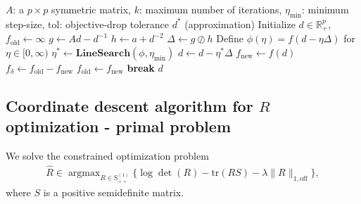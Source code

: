 \documentclass[12pt]{amsart}
\numberwithin{equation}{section}
\numberwithin{equation}{section}
\theoremstyle{plain}
\theoremstyle{definition}
\DeclareMathOperator*{\argmax}{\arg\max}
\newcommand{\tr}{\mathrm{tr}}
\newcommand{\Sppone}{\mathrm{S}_{++}^{(1)}}
\begin{document}
 
\begin{algorithm}[H]
\caption{Diagonal Newton Method for $D$ Optimization}
\label{algo:diag_hess}
\begin{algorithmic}[1]
\Require $A$: a $p\times p$ symmetric matrix, $k$: maximum number of iterations, $\eta_{\min}$: minimum step-size, $\mathrm{tol}$: objective-drop tolerance
\Ensure $d^\ast$ (approximation) 
\State Initialize $d \in \mathbb{R}^p_+$, $f_{\text{old}} \gets \infty$
    \State $g \gets Ad - d^{-1}$ 
    \State $h \gets a+d^{-2}$ 
    \State $\Delta \gets g \oslash h$ 
    \State Define $\phi(\eta) = f(d - \eta\Delta)$ for $\eta\in [0,\infty)$
    \State $\eta^* \gets \textbf{LineSearch}(\phi,\eta_{\min})$ 
    \State $d \gets d - \eta^*\Delta$
    \State $f_{\text{new}} \gets f(d)$
    \State $f_\delta \gets f_{\text{old}} - f_{\text{new}}$
    \State $f_{\text{old}} \gets f_{\text{new}}$
     
        \State \textbf{break} 
    \EndIf
\EndFor
    \State \Return $d$
\EndProcedure
\end{algorithmic}
\end{algorithm}



\subsection{Coordinate descent algorithm for \texorpdfstring{$R$}{R} optimization - primal problem}\label{sec:optRA}


We solve the constrained optimization problem
\begin{align}\label{eq:r_problem}
\hat{R} \in \argmax_{R\in\Sppone}
\Big\{ \log\det(R) - \tr(RS) - \lambda\|R\|_{1,\mathrm{off}} \Big\},
\end{align}
where $S$ is a positive semidefinite matrix.
\end{document}
